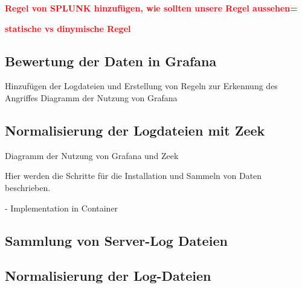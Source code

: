 \textcolor{red}{\textbf{Regel von SPLUNK hinzufügen, wie sollten unsere Regel aussehen=}}

\textcolor{red}{\textbf{statische vs dinymische Regel}}




\subsection{Bewertung der Daten in Grafana}
Hinzufügen der Logdateien und Erstellung von Regeln zur Erkennung des Angriffes
Diagramm der Nutzung von Grafana

\subsection{Normalisierung der Logdateien mit Zeek}
Diagramm der Nutzung von Grafana und Zeek

Hier werden die Schritte für die Installation und Sammeln von Daten beschrieben.

- Implementation in Container %


\subsection{Sammlung von Server-Log Dateien}

\subsection{Normalisierung der Log-Dateien}





